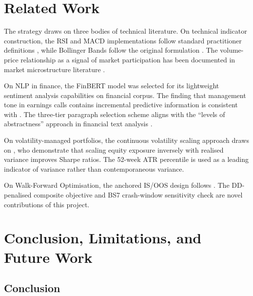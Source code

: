 \documentclass[11pt,twoside,a4paper]{article}
\begin{document}


\section{Related Work}

The strategy draws on three bodies of technical literature. On technical indicator construction, the RSI and MACD implementations follow standard practitioner definitions \citep{Wilder1978}, while Bollinger Bands follow the original formulation \citep{Bollinger2002}. The volume-price relationship as a signal of market participation has been documented in market microstructure literature \citep{Blume1994}.

On NLP in finance, the FinBERT model \citep{Araci2019} was selected for its lightweight sentiment analysis capabilities on financial corpus. The finding that management tone in earnings calls contains incremental predictive information is consistent with \citet{Huang2014}. The three-tier paragraph selection scheme aligns with the ``levels of abstractness'' approach in financial text analysis \citep{Loughran2011}.

On volatility-managed portfolios, the continuous volatility scaling approach draws on \citet{Moreira2017}, who demonstrate that scaling equity exposure inversely with realised variance improves Sharpe ratios. The 52-week ATR percentile is used as a leading indicator of variance rather than contemporaneous variance.

On Walk-Forward Optimisation, the anchored IS/OOS design follows \citet{Pardo2008}. The DD-penalised composite objective and BS7 crash-window sensitivity check are novel contributions of this project.




\section{Conclusion, Limitations, and Future Work}

\subsection{Conclusion}
\end{document}
